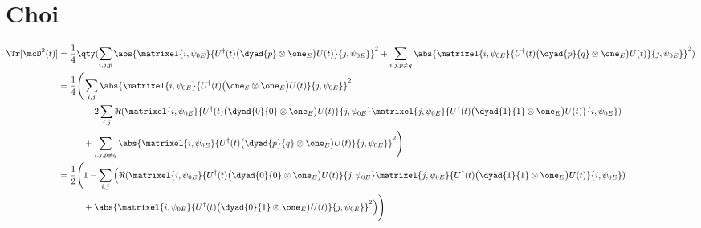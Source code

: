 \section{Choi}
\begin{align}
\label{eq:appendix:A:1}
\Tr[\mcD^2(t)] &= 
\frac{1}{4}
\qty(
\sum_{i,j,p}
\abs{\matrixel{i, \psi_{0E}}
{U^\dagger(t) \big(\dyad{p} \otimes \one_E\big) U(t)}
{j, \psi_{0E}}
}^2 +
\sum_{i,j,p\ne q}
\abs{\matrixel{i, \psi_{0E}}
{U^\dagger(t) \big(\dyad{p}{q} \otimes \one_E\big) U(t)}
{j, \psi_{0E}}
}^2
) \\
\label{eq:appendix:A:2}
&= 
\frac{1}{4}
\Bigg(
\sum_{i,j}
\abs{\matrixel{i, \psi_{0E}}
{U^\dagger(t) \big(\one_S \otimes \one_E\big) U(t)}
{j, \psi_{0E}}
}^2 
\nonumber \\
&\hspace*{10mm}
- 2 \sum_{i,j}
\Re(
\matrixel{i, \psi_{0E}}
{U^\dagger(t) \big(\dyad{0}{0} \otimes \one_E\big) U(t)}
{j, \psi_{0E}}
\matrixel{j, \psi_{0E}}
{U^\dagger(t) \big(\dyad{1}{1} \otimes \one_E\big) U(t)}
{i, \psi_{0E}}
)
\nonumber \\
& \hspace*{10mm}
+ \sum_{i,j,p\ne q}
\abs{\matrixel{i, \psi_{0E}}
{U^\dagger(t) \big(\dyad{p}{q} \otimes \one_E\big) U(t)}
{j, \psi_{0E}}
}^2
\Bigg) \\
\label{eq:appendix:A:3}
&= 
\frac{1}{2} 
\Bigg(
1 - 
\sum_{i,j}
\Big( \Re(
\matrixel{i, \psi_{0E}}
{U^\dagger(t) \big(\dyad{0}{0} \otimes \one_E\big) U(t)}
{j, \psi_{0E}}
\matrixel{j, \psi_{0E}}
{U^\dagger(t) \big(\dyad{1}{1} \otimes \one_E\big) U(t)}
{i, \psi_{0E}}
)
\nonumber \\
& \hspace*{10mm}
+
\abs{\matrixel{i, \psi_{0E}}
{U^\dagger(t) \big(\dyad{0}{1} \otimes \one_E\big) U(t)}
{j, \psi_{0E}}
}^2
\Big)
\Bigg)
\end{align}

